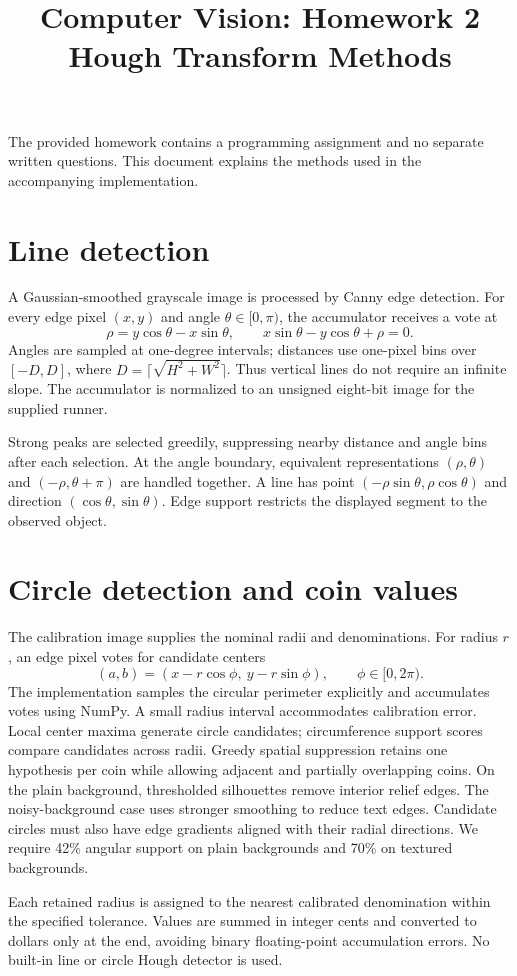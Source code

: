 \documentclass[10pt]{article}
\title{Computer Vision: Homework 2\\Hough Transform Methods}
\author{}
\date{}
\begin{document}
\maketitle
\noindent The provided homework contains a programming assignment and no separate written questions. This document explains the methods used in the accompanying implementation.
\section{Line detection}
A Gaussian-smoothed grayscale image is processed by Canny edge detection. For every edge pixel $(x,y)$ and angle $\theta\in[0,\pi)$, the accumulator receives a vote at
\[
\rho=y\cos\theta-x\sin\theta,
\qquad x\sin\theta-y\cos\theta+\rho=0.
\]
Angles are sampled at one-degree intervals; distances use one-pixel bins over $[-D,D]$, where $D=\lceil\sqrt{H^2+W^2}\rceil$. Thus vertical lines do not require an infinite slope. The accumulator is normalized to an unsigned eight-bit image for the supplied runner.

Strong peaks are selected greedily, suppressing nearby distance and angle bins after each selection. At the angle boundary, equivalent representations $(\rho,\theta)$ and $(-\rho,\theta+\pi)$ are handled together. A line has point $(-\rho\sin\theta,\rho\cos\theta)$ and direction $(\cos\theta,\sin\theta)$. Edge support restricts the displayed segment to the observed object.
\section{Circle detection and coin values}
The calibration image supplies the nominal radii and denominations. For radius $r$, an edge pixel votes for candidate centers
\[
(a,b)=(x-r\cos\phi,\ y-r\sin\phi),\qquad \phi\in[0,2\pi).
\]
The implementation samples the circular perimeter explicitly and accumulates votes using NumPy. A small radius interval accommodates calibration error. Local center maxima generate circle candidates; circumference support scores compare candidates across radii. Greedy spatial suppression retains one hypothesis per coin while allowing adjacent and partially overlapping coins. On the plain background, thresholded silhouettes remove interior relief edges. The noisy-background case uses stronger smoothing to reduce text edges. Candidate circles must also have edge gradients aligned with their radial directions. We require 42\% angular support on plain backgrounds and 70\% on textured backgrounds.

Each retained radius is assigned to the nearest calibrated denomination within the specified tolerance. Values are summed in integer cents and converted to dollars only at the end, avoiding binary floating-point accumulation errors. No built-in line or circle Hough detector is used.
\end{document}
